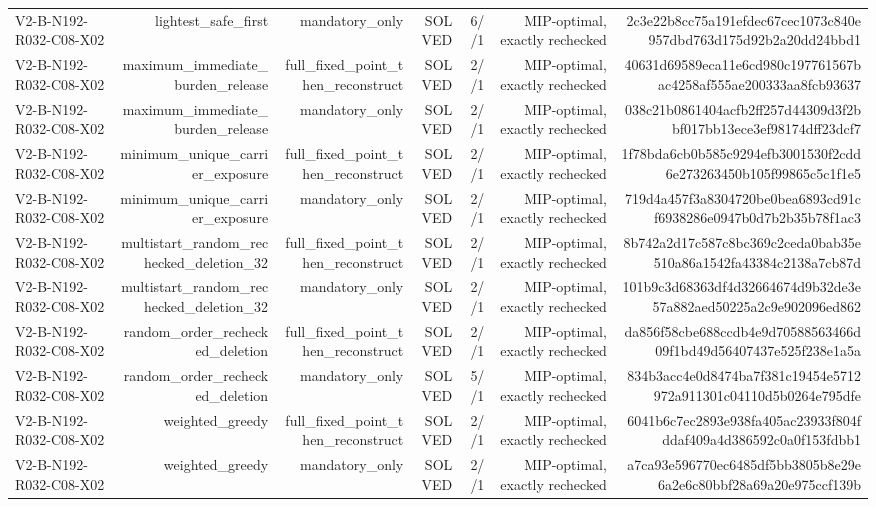 {\begin{longtable}{lrrrrrr}
V2-B-N192-R032-C08-X02 & lightest\_safe\_first & mandatory\_only & SOLVED & 6//1 & MIP-optimal, exactly rechecked & 2c3e22b8cc75a191efdec67cec1073c840e957dbd763d175d92b2a20dd24bbd1 \\
V2-B-N192-R032-C08-X02 & maximum\_immediate\_burden\_release & full\_fixed\_point\_then\_reconstruct & SOLVED & 2//1 & MIP-optimal, exactly rechecked & 40631d69589eca11e6cd980c197761567bac4258af555ae200333aa8fcb93637 \\
V2-B-N192-R032-C08-X02 & maximum\_immediate\_burden\_release & mandatory\_only & SOLVED & 2//1 & MIP-optimal, exactly rechecked & 038c21b0861404acfb2ff257d44309d3f2bbf017bb13ece3ef98174dff23dcf7 \\
V2-B-N192-R032-C08-X02 & minimum\_unique\_carrier\_exposure & full\_fixed\_point\_then\_reconstruct & SOLVED & 2//1 & MIP-optimal, exactly rechecked & 1f78bda6cb0b585c9294efb3001530f2cdd6e273263450b105f99865c5c1f1e5 \\
V2-B-N192-R032-C08-X02 & minimum\_unique\_carrier\_exposure & mandatory\_only & SOLVED & 2//1 & MIP-optimal, exactly rechecked & 719d4a457f3a8304720be0bea6893cd91cf6938286e0947b0d7b2b35b78f1ac3 \\
V2-B-N192-R032-C08-X02 & multistart\_random\_rechecked\_deletion\_32 & full\_fixed\_point\_then\_reconstruct & SOLVED & 2//1 & MIP-optimal, exactly rechecked & 8b742a2d17c587c8bc369c2ceda0bab35e510a86a1542fa43384c2138a7cb87d \\
V2-B-N192-R032-C08-X02 & multistart\_random\_rechecked\_deletion\_32 & mandatory\_only & SOLVED & 2//1 & MIP-optimal, exactly rechecked & 101b9c3d68363df4d32664674d9b32de3e57a882aed50225a2c9e902096ed862 \\
V2-B-N192-R032-C08-X02 & random\_order\_rechecked\_deletion & full\_fixed\_point\_then\_reconstruct & SOLVED & 2//1 & MIP-optimal, exactly rechecked & da856f58cbe688ccdb4e9d70588563466d09f1bd49d56407437e525f238e1a5a \\
V2-B-N192-R032-C08-X02 & random\_order\_rechecked\_deletion & mandatory\_only & SOLVED & 5//1 & MIP-optimal, exactly rechecked & 834b3acc4e0d8474ba7f381c19454e5712972a911301c04110d5b0264e795dfe \\
V2-B-N192-R032-C08-X02 & weighted\_greedy & full\_fixed\_point\_then\_reconstruct & SOLVED & 2//1 & MIP-optimal, exactly rechecked & 6041b6c7ec2893e938fa405ac23933f804fddaf409a4d386592c0a0f153fdbb1 \\
V2-B-N192-R032-C08-X02 & weighted\_greedy & mandatory\_only & SOLVED & 2//1 & MIP-optimal, exactly rechecked & a7ca93e596770ec6485df5bb3805b8e29e6a2e6c80bbf28a69a20e975ccf139b \\

\end{longtable}}
